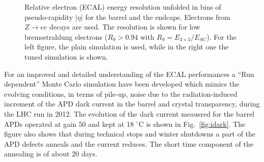 \documentclass[journal]{IEEEtran}
\begin{document}
\begin{figure}[!t]
  \begin{center}
    \caption{Relative electron (ECAL) energy resolution unfolded in bins of pseudo-rapidity $\vert\eta\vert$ for the barrel and the endcaps. Electrons from $Z\to ee$ decays are used. The resolution is shown for low bremsstrahlung electrons ($R_9>0.94$ with $R_9 = E_{3 \times 3} / E_{SC}$). For the left figure, the plain simulation is used, while in the right one the tuned simulation is shown. ~\label{energy_resol}}
  \end{center}
\end{figure}
%
For an improved and detailed understanding of the ECAL performances a ``Run dependent'' Monte Carlo simulation have been developed which mimics the evolving conditions, in terms of pile-up, noise due to the radiation-induced increment of the APD dark current in the barrel and crystal transparency, during the LHC run in 2012. The evolution of the dark current meausred for the barrel APDs operated at gain 50 and kept at 18 $^\circ$C is shown in Fig.~\ref{fig:idark}. The figure also shows that during technical stops and winter shutdowns a part of the APD defects anneals and the current reduces. The short time component of the annealing is of about 20 days. 
\end{document}
